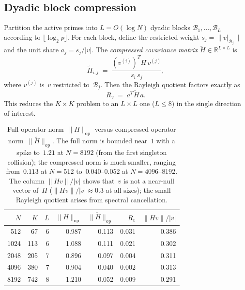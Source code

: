 \documentclass[11pt]{article}
\theoremstyle{definition}
\theoremstyle{remark}
\begin{document}
\subsection{Dyadic block compression}
\label{ssec:block-compression}

Partition the active primes into
$L = O(\log N)$ dyadic blocks
$\mathcal{B}_1, \ldots, \mathcal{B}_L$
according to $\lfloor \log_2 p \rfloor$.
For each block, define the restricted weight
$s_j = \|v|_{\mathcal{B}_j}\|$ and the unit share
$a_j = s_j / |v|$.
The \emph{compressed covariance matrix}
$\tilde{H} \in \mathbb{R}^{L \times L}$ is
\begin{equation}\label{eq:compressed}
  \tilde{H}_{i,j}
  \;=\;
  \frac{(v^{(i)})^T H\, v^{(j)}}{s_i\, s_j},
\end{equation}
where $v^{(j)}$ is~$v$ restricted to~$\mathcal{B}_j$.
Then the Rayleigh quotient factors exactly as
\begin{equation}\label{eq:compressed-rayleigh}
  R_v \;=\; a^T \tilde{H}\, a.
\end{equation}
This reduces the $K \times K$ problem to an
$L \times L$ one ($L \le 8$) in the single
direction of interest.

\begin{table}[ht]
\centering
\begin{tabular}{rrrrrrr}
\hline
$N$ & $K$ & $L$ & $\|H\|_{\mathrm{op}}$
  & $\|\tilde{H}\|_{\mathrm{op}}$
  & $R_v$ & $\|Hv\|/|v|$ \\
\hline
512  & 67  & 6 & 0.987 & 0.113 & 0.031 & 0.386 \\
1024 & 113 & 6 & 1.088 & 0.111 & 0.021 & 0.302 \\
2048 & 205 & 7 & 0.896 & 0.097 & 0.004 & 0.311 \\
4096 & 380 & 7 & 0.904 & 0.040 & 0.002 & 0.313 \\
8192 & 742 & 8 & 1.210 & 0.052 & 0.009 & 0.291 \\
\hline
\end{tabular}
\caption{Full operator norm~$\|H\|_{\mathrm{op}}$
versus compressed operator norm~$\|\tilde{H}\|_{\mathrm{op}}$.
The full norm is bounded near~$1$ with a spike
to~$1.21$ at $N = 8192$ (from the first singleton collision);
the compressed norm is much smaller,
ranging from~$0.113$ at $N = 512$ to~$0.040$--$0.052$
at $N = 4096$--$8192$.
The column $\|Hv\|/|v|$ shows that~$v$ is not a
near-null vector of~$H$
($\|Hv\|/|v| \approx 0.3$ at all sizes);
the small Rayleigh quotient arises from
spectral cancellation.}
\label{tab:compressed}
\end{table}
\end{document}
